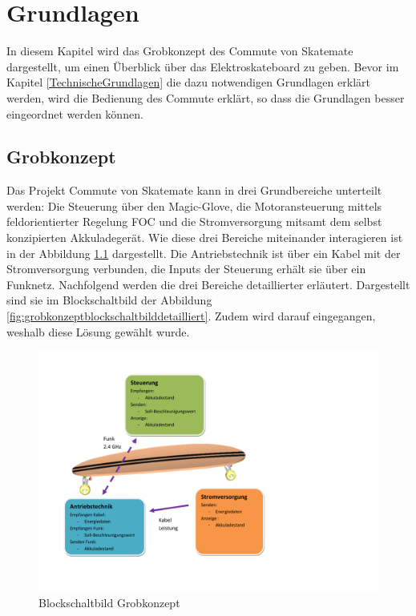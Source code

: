 \chapter{Grundlagen}
\label{Grundlagen}
In diesem Kapitel wird das Grobkonzept des Commute von Skatemate dargestellt, um einen Überblick über das Elektroskateboard zu geben. Bevor im Kapitel \ref{TechnischeGrundlagen} die dazu notwendigen Grundlagen erklärt werden, wird die Bedienung des Commute erklärt, so dass die Grundlagen besser eingeordnet werden können. 
\section{Grobkonzept}
\label{Grobkonzept}
Das Projekt Commute von Skatemate kann in drei Grundbereiche unterteilt werden: Die Steuerung über den Magic-Glove, die Motoransteuerung mittels feldorientierter Regelung FOC und die Stromversorgung mitsamt dem selbst konzipierten Akkuladegerät. Wie diese drei Bereiche miteinander interagieren ist in der Abbildung \ref{fig:grobkonzeptblockschaltbildgrob} dargestellt. Die Antriebstechnik ist über ein Kabel mit der Stromversorgung verbunden, die Inputs der Steuerung erhält sie über ein Funknetz. Nachfolgend werden die drei Bereiche detaillierter erläutert. Dargestellt sind sie im Blockschaltbild der Abbildung \ref{fig:grobkonzeptblockschaltbilddetailliert}. Zudem wird darauf eingegangen, weshalb diese Lösung gewählt wurde. 
\begin{figure}[H]
	\centering
	\includegraphics[width=0.7\linewidth, keepaspectratio]{images/Grobkonzept_Blockschaltbild_grob}
	\caption[Blockschaltbild Grobkonzept]{Blockschaltbild Grobkonzept}
	\label{fig:grobkonzeptblockschaltbildgrob}
\end{figure}

